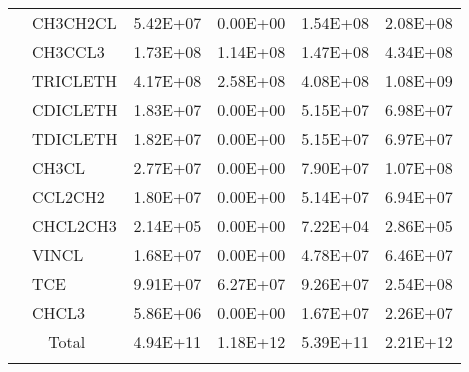 \begin{longtable}{llllll}
	 & CH3CH2CL & 5.42E+07 & 0.00E+00 & 1.54E+08 & 2.08E+08 \\
	 & CH3CCL3 & 1.73E+08 & 1.14E+08 & 1.47E+08 & 4.34E+08 \\
	 & TRICLETH & 4.17E+08 & 2.58E+08 & 4.08E+08 & 1.08E+09 \\
	 & CDICLETH & 1.83E+07 & 0.00E+00 & 5.15E+07 & 6.98E+07 \\
	 & TDICLETH & 1.82E+07 & 0.00E+00 & 5.15E+07 & 6.97E+07 \\
	 & CH3CL & 2.77E+07 & 0.00E+00 & 7.90E+07 & 1.07E+08 \\
	 & CCL2CH2 & 1.80E+07 & 0.00E+00 & 5.14E+07 & 6.94E+07 \\
	 & CHCL2CH3 & 2.14E+05 & 0.00E+00 & 7.22E+04 & 2.86E+05 \\
	 & VINCL & 1.68E+07 & 0.00E+00 & 4.78E+07 & 6.46E+07 \\
	 & TCE & 9.91E+07 & 6.27E+07 & 9.26E+07 & 2.54E+08 \\
	 & CHCL3 & 5.86E+06 & 0.00E+00 & 1.67E+07 & 2.26E+07 \\
	\hline \multicolumn{2}{c}{Total}  & 4.94E+11 & 1.18E+12 & 5.39E+11 & 2.21E+12 \\
	\hline \hline
	\label{t:MOZART_NMVOC_emissions}
\end{longtable}